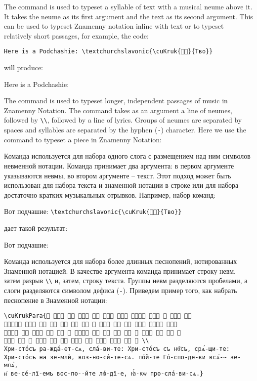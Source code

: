 \begin{EN}
The command  is used to typeset a syllable of text with a musical neume above it. It takes the neume as its first argument and the text as its second argument. This can be used to typeset Znamenny notation inline with text or to typeset relatively short passages, for example, the code:

\verb+Here is a Podchashie: \textchurchslavonic{\cuKruk{𜽰𜼅}{Тво}}+

will produce:

Here is a Podchashie: 

The  command is used to typeset longer, independent passages of music in Znamenny Notation. The command takes as an argument a line of neumes, followed by \verb+\\+, followed by a line of lyrics. Groups of neumes are separated by spaces and syllables are separated by the hyphen (\verb+-+) character. Here we use the command to typeset a piece in Znamenny Notation:
\end{EN}
%
\begin{RU}
Команда  используется для набора одного слога с размещением над ним символов невменной нотации. Команда принимает два аргумента: в первом аргументе указываются невмы, во втором аргументе -- текст. Этот подход может быть использован для набора текста и знаменной нотации в строке или для набора достаточно кратких музыкальных отрывков. Например, набор команд:

Вот подчашие: \verb+\textchurchslavonic{\cuKruk{𜽰𜼅}{Тво}}+

\noindent дает такой результат:

Вот подчашие: 

Команда  используется для набора более длинных песнопений, нотированных Знаменной нотацией. В качестве аргумента команда принимает строку невм, затем разрыв \verb+\\+ и, затем, строку текста. Группы невм разделяются пробелами, а слоги разделяются символом дефиса (\verb+-+). Приведем пример того, как набрать песнопение в Знаменной нотации:
\end{RU}

\medskip

\begin{verbatim}
\cuKrukPara{𜽟 𜾆𜼱𜼇 𜽗𜼆 𜽐𜼱𜼢 𜽖𜼅 𜽜𜼄𜼦 𜾖𜼆𜼤 𜽝𜼅𜼤𜽘 𜾆𜼱𜼈 𜽞 𜾬𜼈𜼤 𜽖𜼅 
𜾒𜼰𜼺𜼆𜼣 𜾖𜼆𜼤 𜾋𜼅 𜾆𜼄 𜽝𜼄 𜽐𜼅 𜽗𜼄 𜽞 𜽐𜼰𜼅 𜽖𜼢 𜽗𜼢 𜾆𜾅𜼇 𜽝𜼄𜼤𜽘 𜾆𜼱𜼇 
𜾒𜼱𜼈𜼤 𜽗𜼇 𜽐𜼱𜼢 𜽖𜼆 𜽗𜼅 𜽞 𜾒𜼰𜼺𜼆 𜽝𜼄 𜽜𜼅 𜾆𜼄 𜽗𜼅 𜽞 𜽐𜼱𜼇 𜽜𜼆 𜾆𜼅 𜽞 
𜽐𜼱𜼈 𜽗𜼇 𜽞 𜽐𜼱𜼇 𜽖𜼆 𜽗𜼅 𜽐𜼱𜼆 𜽖𜼅 𜽜𜼄𜼶 𜾖𜼆𜼤 𜾋𜼅 𜾁 \\
Хри-сто́съ ра-жда́-ет-сѧ, сла́-ви-те: Хри-сто́съ съ нб҃съ, срѧ́-щи-те:
Хри-сто́съ на зе-млѝ, воз-но-си́-те-сѧ. по́й-те Го́-спо-де-ви всѧ̀-~ зе-млѧ̀,
и҆ ве-се́-лї-емъ вос-по--йте лю́-дї-е, ꙗ҆́-кѡ про-сла́-ви-сѧ.}
\end{verbatim}

